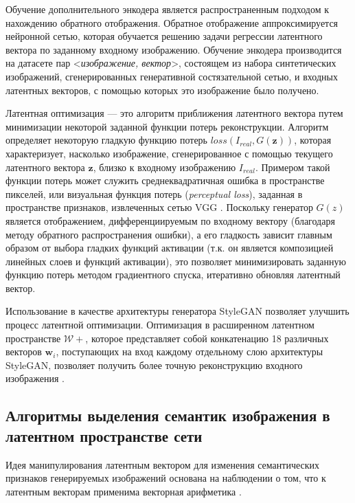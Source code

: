 Обучение дополнительного энкодера \cite{donahue2016adversarial} является распространенным подходом к нахождению обратного отображения.
Обратное отображение аппроксимируется нейронной сетью, которая обучается решению задачи регрессии латентного вектора по заданному входному изображению. 
Обучение энкодера производится на датасете пар <\emph{изображение, вектор}>, состоящем из набора синтетических изображений, сгенерированных генеративной состязательной сетью, и входных латентных векторов, с помощью которых это изображение было получено.

Латентная оптимизация \cite{perarnau2016invertible} --- это алгоритм приближения латентного вектора путем минимизации некоторой заданной функции потерь реконструкции.
Алгоритм определяет некоторую гладкую функцию потерь $loss(I_{real}, G(\mathbf z)) $, которая характеризует, насколько изображение, сгенерированное с помощью текущего латентного вектора $\mathbf z$, близко к входному изображению $I_{real}$.
Примером такой функции потерь может служить среднеквадратичная ошибка в пространстве пикселей, или визуальная функция потерь (\emph{perceptual loss}), заданная в пространстве признаков, извлеченных сетью VGG \cite{Johnson2016Perceptual}.
Поскольку генератор $G(z)$ является отображением, дифференциируемым по входному вектору (благодаря методу обратного распространения ошибки), а его гладкость зависит главным образом от выбора гладких функций активации (т.к. он является композицией линейных слоев и функций активации), это позволяет минимизировать заданную функцию потерь методом градиентного спуска, итеративно обновляя латентный вектор.

Использование в качестве архитектуры генератора StyleGAN позволяет улучшить процесс латентной оптимизации.
Оптимизация в расширенном латентном пространстве $\mathcal W+$, которое представляет собой конкатенацию 18 различных векторов $\mathbf w_i$, поступающих на вход каждому отдельному слою архитектуры StyleGAN, позволяет получить более точную реконструкцию входного изображения \cite{abdal2019image2stylegan}.


\subsection{Алгоритмы выделения семантик изображения в латентном пространстве сети}

Идея манипулирования латентным вектором для изменения семантических признаков генерируемых изображений основана на наблюдении о том, что к латентным векторам применима векторная арифметика \cite{radford2015unsupervised}.

